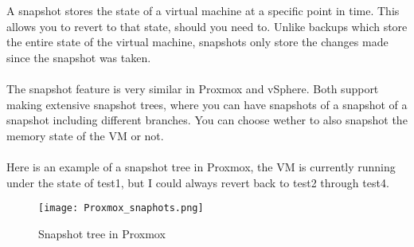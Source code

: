 A snapshot stores the state of a virtual machine at a specific point in time. This allows you to revert to that state, should you need to. Unlike backups which store the entire state of the virtual machine, snapshots only store the changes made since the snapshot was taken.
\\\\
The snapshot feature is very similar in Proxmox and vSphere. Both support making extensive snapshot trees, where you can have snapshots of a snapshot of a snapshot including different branches. You can choose wether to also snapshot the memory state of the VM or not.
\\\\
Here is an example of a snapshot tree in Proxmox, the VM is currently running under the state of test1, but I could always revert back to test2 through test4.

\begin{figure}[H]
	\texttt{[image: Proxmox\_snaphots.png]} %
	\caption{Snapshot tree in Proxmox} %
	\label{fig:Snapshot tree in Proxmox} %
\end{figure}